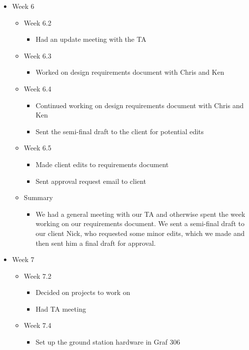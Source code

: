 \begin{itemize}
\item Week 6
	\begin{itemize}
	\item Week 6.2
      \begin{itemize}
      \item Had an update meeting with the TA 
      \end{itemize}
	\item Week 6.3
      \begin{itemize}
      \item Worked on design requirements document with Chris and Ken 
      \end{itemize}
	\item Week 6.4
      \begin{itemize}
      \item Continued working on design requirements document with Chris and Ken 
      \item Sent the semi-final draft to the client for potential edits 
      \end{itemize}
	\item Week 6.5
      \begin{itemize}
      \item Made client edits to requirements document 
      \item Sent approval request email to client 
      \end{itemize}
    
    \item Summary
      \begin{itemize}
      \item We had a general meeting with our TA and otherwise spent the week working on our requirements document. We sent a semi-final draft to our client Nick, who requested some minor edits, which we made and then sent him a final draft for approval.  
      \end{itemize}
	\end{itemize}

\item Week 7
	\begin{itemize}
	\item Week 7.2
      \begin{itemize}
      \item Decided on projects to work on 
      \item Had TA meeting
      \end{itemize}
	\item Week 7.4
      \begin{itemize}
      \item Set up the ground station hardware in Graf 306 
      \end{itemize}
    

\end{itemize}
\end{itemize}
